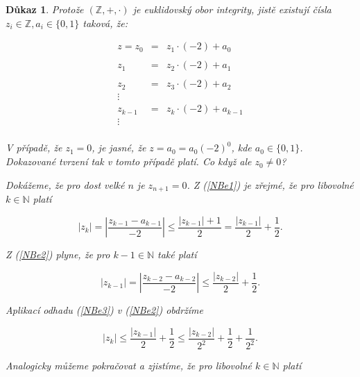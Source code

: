 \documentclass[12pt]{book}
\newtheorem*{dukaz}{Důkaz}
\begin{document}
\begin{dukaz}
	Protože $(\mathbb{Z},+,\cdot)$ je euklidovský obor integrity, jistě existují čísla $z_i\in\mathbb{Z}, a_i\in\{0,1\}$ taková, že:

\begin{equation}\label{NBe1}
  \begin{array}{rcl}
z = z_0 & = & z_1\cdot(-2) + a_0   \\
            &   &                  \\
    z_1 & = & z_2\cdot(-2) + a_1   \\
            &   &                  \\
    z_2 & = & z_3\cdot(-2) + a_2   \\
\vdots  &   &                      \\
    z_{k-1} & = & z_{k}\cdot(-2) + a_{k-1}  \\
\vdots  &   &                      \\
  \end{array}
\end{equation}

V případě, že $z_1=0$, je jasné, že $z = a_0 = a_0(-2)^0$, kde $a_0\in\{0,1\}$. Dokazované tvrzení tak v tomto případě platí. Co když ale $z_0 \neq 0$?

Dokážeme, že pro dost velké $n$ je $z_{n+1} = 0$.  Z (\ref{NBe1}) je zřejmé, že pro libovolné $k \in \mathbb{N}$ platí

\begin{equation}\label{NBe2}
|z_k|=\left|\frac{z_{k-1}-a_{k-1}}{-2}\right|\leq \frac{|z_{k-1}|+1}{2} = \frac{|z_{k-1}|}{2} + \frac{1}{2}.
\end{equation}

Z (\ref{NBe2}) plyne, že pro $k-1 \in \mathbb{N}$ také platí

\begin{equation}\label{NBe3}
|z_{k-1}|=\left|\frac{z_{k-2}-a_{k-2}}{-2}\right|\leq \frac{|z_{k-2}|}{2} + \frac{1}{2}.
\end{equation}

Aplikací odhadu (\ref{NBe3}) v (\ref{NBe2}) obdržíme

\begin{equation*}\label{NBe4}
|z_k| \leq \frac{|z_{k-1}|}{2} + \frac{1}{2} \leq \frac{|z_{k-2}|}{2^2} + \frac{1}{2} +  \frac{1}{2^2}.
\end{equation*}

Analogicky můžeme pokračovat a zjistíme, že pro libovolné $k \in \mathbb{N}$ platí


\end{dukaz}
\end{document}
